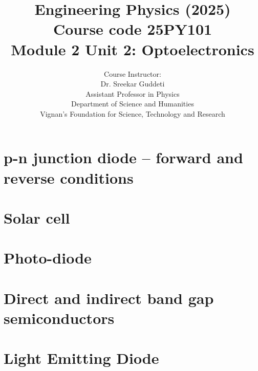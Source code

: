 \documentclass[aspectratio=1610, handout]{beamer}
\title[Engineering Physics]{Engineering Physics (2025) \\ Course code
	25PY101 \\ Module 2 Unit 2: Optoelectronics}
\author{Course Instructor:\\ 
	{\color{VignanBlue} Dr. Sreekar Guddeti}\\
	Assistant Professor in Physics\\
	Department of Science and Humanities \\
	{\color{VignanRed}Vignan's Foundation for Science, Technology and Research}
}
\newif\ifshowhidden
\begin{document}
	\begin{frame}[label=titleframe]
		\titlepage
	\end{frame}
	
	\section{p-n junction diode -- forward and reverse conditions}
	
	\section{Solar cell}
	
	\section{Photo-diode}
	
	\section{Direct and indirect band gap semiconductors}
	
	\section{Light Emitting Diode}
	
	
\end{document}
